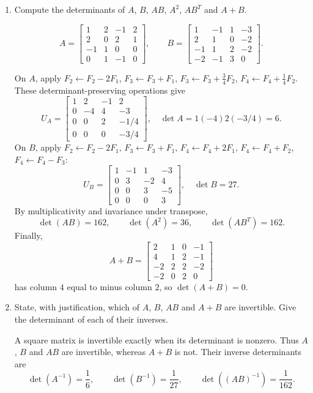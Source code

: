 \begin{enumerate}[label=\alph*)]

\item Compute the determinants of $A$, $B$, $AB$, $A^2$, $AB^T$ and $A+B$.

\begin{answer}
\[
 A=\begin{bmatrix}1&2&-1&2\\2&0&2&1\\-1&1&0&0\\0&1&-1&0\end{bmatrix},\qquad
 B=\begin{bmatrix}1&-1&1&-3\\2&1&0&-2\\-1&1&2&-2\\-2&-1&3&0\end{bmatrix}.
\]

On $A$, apply $F_2\gets F_2-2F_1$, $F_3\gets F_3+F_1$,
$F_3\gets F_3+\frac34F_2$, $F_4\gets F_4+\frac14F_2$.
These determinant-preserving operations give
\[
 U_A=\begin{bmatrix}1&2&-1&2\\0&-4&4&-3\\0&0&2&-1/4\\0&0&0&-3/4\end{bmatrix},
 \quad\det A=1(-4)2(-3/4)=6.
\]
On $B$, apply $F_2\gets F_2-2F_1$, $F_3\gets F_3+F_1$,
$F_4\gets F_4+2F_1$, $F_4\gets F_4+F_2$, $F_4\gets F_4-F_3$:
\[
 U_B=\begin{bmatrix}1&-1&1&-3\\0&3&-2&4\\0&0&3&-5\\0&0&0&3\end{bmatrix},
 \quad\det B=27.
\]
By multiplicativity and invariance under transpose,
\[
 \det(AB)=162,\qquad\det(A^2)=36,\qquad\det(AB^T)=162.
\]
Finally,
\[
 A+B=\begin{bmatrix}2&1&0&-1\\4&1&2&-1\\-2&2&2&-2\\-2&0&2&0\end{bmatrix}
\]
has column $4$ equal to minus column $2$, so $\det(A+B)=0$.
\end{answer}

\item State, with justification, which of $A$, $B$, $AB$ and $A+B$ are invertible. Give the determinant of each of their inverses.

\begin{answer}
A square matrix is invertible exactly when its determinant is nonzero.
Thus $A$, $B$ and $AB$ are invertible, whereas $A+B$ is not. Their inverse
determinants are
\[
 \det(A^{-1})=\frac16,\qquad\det(B^{-1})=\frac1{27},\qquad
 \det((AB)^{-1})=\frac1{162}.
\]
\end{answer}
\end{enumerate}
